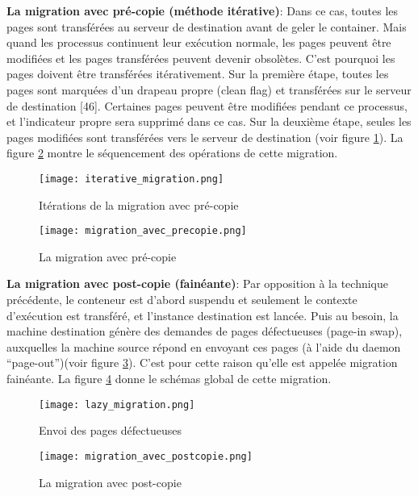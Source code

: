 \textbf{La migration avec pré-copie (méthode itérative)}: Dans ce cas, toutes les pages sont transférées au serveur de destination avant de geler le container. Mais quand les processus continuent leur exécution normale, les pages peuvent être modifiées et les pages transférées peuvent devenir obsolètes. C'est pourquoi les pages doivent être transférées itérativement. Sur la première étape, toutes les pages sont marquées d'un drapeau propre (clean flag) et transférées sur le serveur de destination [46]. Certaines pages peuvent être modifiées pendant ce processus, et l'indicateur propre sera supprimé dans ce cas. Sur la deuxième étape, seules les pages modifiées sont transférées vers le serveur de destination (voir figure \ref{fig:migration_avec_precopie1}). La figure \ref{fig:migration_avec_precopie2} montre le séquencement des opérations de cette migration.\par
\begin{figure}[H]
\centering
\texttt{[image: iterative\_migration.png]}
\caption{Itérations de la migration avec pré-copie \cite{mirkin2008}}
\label{fig:migration_avec_precopie1}
\end{figure}
\begin{figure}[H]
\centering
\texttt{[image: migration\_avec\_precopie.png]}
\caption{La migration avec pré-copie \cite{puliafito2019}}
\label{fig:migration_avec_precopie2}
\end{figure}
\textbf{La migration avec post-copie (fainéante)}: Par opposition à la technique précédente, le conteneur est d'abord suspendu et seulement le contexte d'exécution est transféré, et l'instance destination est lancée. Puis au besoin, la machine destination génère des demandes de pages défectueuses (page-in swap), auxquelles la machine source répond en envoyant ces pages (à l'aide du daemon “page-out”)(voir figure \ref{fig:migration_avec_postcopie1}). C'est pour cette raison qu'elle est appelée migration fainéante. La figure \ref{fig:migration_avec_postcopie2} donne le schémas global de cette migration.\par
\begin{figure}[H]
\centering
\texttt{[image: lazy\_migration.png]}
\caption{Envoi des pages défectueuses \cite{mirkin2008}}
\label{fig:migration_avec_postcopie1}
\end{figure}
\begin{figure}[H]
\centering
\texttt{[image: migration\_avec\_postcopie.png]}
\caption{La migration avec post-copie \cite{puliafito2019}}
\label{fig:migration_avec_postcopie2}
\end{figure}
